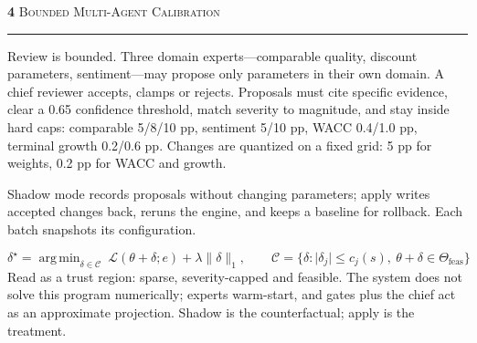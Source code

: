\documentclass[10pt]{article}
\newcommand{\sectnumfont}{\fontsize{33}{35}\selectfont\bfseries}
\newcommand{\secttitlefont}{\fontsize{31}{35}\selectfont\scshape\addfontfeatures{LetterSpace=6}}
\DeclareMathOperator*{\argmin}{arg\,min}
\newcommand{\postersection}[2]{%
  \par\vspace{10.2mm}%
  \noindent
  {\color{burgundy}\sectnumfont #1}\hspace{5mm}%
  {\color{oxford}\secttitlefont #2}\par
  \vspace{2.2mm}%
  {\color{gold}\rule{\linewidth}{0.55pt}}\par
  \vspace{3.4mm}%
}
\begin{document}
\begin{minipage}[t]{385.5mm}\RaggedRight

\postersection{4}{Bounded Multi-Agent Calibration}
Review is bounded. Three domain experts---comparable quality, discount
parameters, sentiment---may propose only parameters in their own domain. A
chief reviewer accepts, clamps or rejects. Proposals must cite specific
evidence, clear a 0.65 confidence threshold, match severity to magnitude, and
stay inside hard caps: comparable 5/8/10 pp, sentiment 5/10 pp, WACC 0.4/1.0 pp,
terminal growth 0.2/0.6 pp. Changes are quantized on a fixed grid: 5 pp for
weights, 0.2 pp for WACC and growth.

Shadow mode records proposals without changing parameters; apply writes
accepted changes back, reruns the engine, and keeps a baseline for rollback.
Each batch snapshots its configuration.

\begin{equation}
\delta^\star=\argmin_{\delta\in\mathcal{C}}\ \mathcal{L}(\theta+\delta;e)+\lambda\lVert\delta\rVert_1,
\qquad
\mathcal{C}=\{\delta:\lvert\delta_j\rvert\le c_j(s),\ \theta+\delta\in\Theta_{\mathrm{feas}}\}
\end{equation}
Read as a trust region: sparse, severity-capped and feasible. The system does
not solve this program numerically; experts warm-start, and gates plus the chief
act as an approximate projection. Shadow is the counterfactual; apply is the
treatment.

\begin{center}
\end{center}
\end{minipage}
\end{document}
